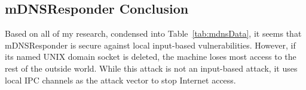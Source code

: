 \subsection{mDNSResponder Conclusion}
\label{sec:mdnsConclusion}
Based on all of my research, condensed into Table~\ref{tab:mdnsData}, it seems that mDNSResponder is secure against local input-based vulnerabilities.  However, if its named UNIX domain socket is deleted, the machine loses most access to the rest of the outside world.  While this attack is not an input-based attack, it uses local IPC channels as the attack vector to stop Internet access.
